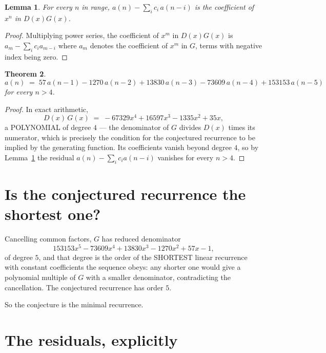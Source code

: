\documentclass[11pt,a4paper]{article}
\theoremstyle{plain}
\newtheorem{theorem}{Theorem}
\newtheorem{lemma}[theorem]{Lemma}
\theoremstyle{definition}
\begin{document}
\begin{lemma}\label{lem:key}
For every $n$ in range, $a(n)-\sum_i c_i\,a(n-i)$ is the coefficient of $x^{n}$ in
$D(x)G(x)$.
\end{lemma}

\begin{proof}
Multiplying power series, the coefficient of $x^{m}$ in $D(x)G(x)$ is
$a_m-\sum_i c_i a_{m-i}$ where $a_m$ denotes the coefficient of $x^{m}$ in $G$, terms with
negative index being zero.
\end{proof}

\begin{theorem}
\[
a(n)\;=\;57\,a(n-1) - 1270\,a(n-2) + 13830\,a(n-3) - 73609\,a(n-4) + 153153\,a(n-5)
\]
for every $n>4$.
\end{theorem}

\begin{proof}
In exact arithmetic,
\[
D(x)\,G(x)\;=\;- 67329 x^{4} + 16597 x^{3} - 1335 x^{2} + 35 x,
\]
a POLYNOMIAL of degree $4$ --- the denominator of $G$ divides $D(x)$ times its numerator,
which is precisely the condition for the conjectured recurrence to be implied by the
generating function. Its coefficients vanish beyond degree $4$, so by
Lemma~\ref{lem:key} the residual $a(n)-\sum_ic_ia(n-i)$ vanishes for every
$n>4$.
\end{proof}

\section{Is the conjectured recurrence the shortest one?}

Cancelling common factors, $G$ has reduced denominator
\[
153153 x^{5} - 73609 x^{4} + 13830 x^{3} - 1270 x^{2} + 57 x - 1,
\]
of degree $5$, and that degree is the order of the SHORTEST linear recurrence with
constant coefficients the sequence obeys: any shorter one would give a polynomial multiple of
$G$ with a smaller denominator, contradicting the cancellation. The conjectured recurrence has
order $5$.

So the conjecture is the minimal recurrence.

\section{The residuals, explicitly}
\end{document}
